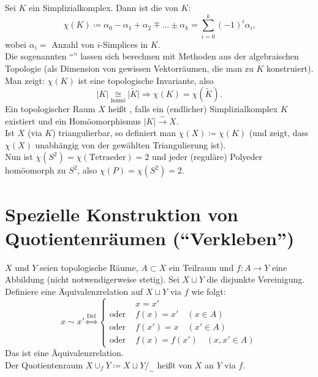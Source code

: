 \begin{definition}
  Sei \( K \) ein Simplizialkomplex. Dann ist die \label{def:eulercharakteristikSimplizialkomplex} von \( K \):
  \begin{equation*}
    \chi(K) \coloneqq \alpha_0-\alpha_1+\alpha_2 \mp \dots \pm \alpha_k = \sum_{i = 0}^k {(-1)}^i\alpha_i\text{,}
  \end{equation*}
  wobei \( \alpha_i = \) Anzahl von \( i \)-Simplices in \( K \). \\
  Die sogenannten ``''\label{def:bettiZahlen} lassen sich berechnen mit Methoden aus der algebraischen Topologie (als Dimension von gewissen Vektorräumen, die man zu \( K \) konstruiert). \\
  Man zeigt: \( \chi(K) \) ist eine topologische Invariante, also 
  \begin{equation*}
    \vert K \vert \underset{\text{homö}}{\cong} \vert \widetilde{K} \vert \Rightarrow \chi(K) = \chi(\widetilde{K})\text{.}
  \end{equation*}
  Ein topologischer Raum \( X \) heißt \label{def:triangulierbar}, falls ein (endlicher) Simplizialkomplex \( K \) existiert und ein Homöomorphismus \( \vert K \vert \overset{\sim}{\to} X \). \\
  Ist \( X \) (via \( K \)) triangulierbar, so definiert man \( \chi(X) \coloneqq \chi(K) \) (und zeigt, dass \( \chi(X) \) unabhängig von der gewählten Triangulierung ist). \\
  Nun ist \( \chi(S^2) = \chi(\text{Tetraeder}) = 2 \) und jeder (reguläre) Polyeder homöomorph zu \( S^2 \), also \( \chi(P) = \chi(S^2) = 2 \).
\end{definition}

\section{Spezielle Konstruktion von Quotientenräumen (``Verkleben'')}

\begin{definition}[Verklebung]
  \( X \) und \( Y \) seien topologische Räume, \( A \subset X \) ein Teilraum und \( f: A \to Y \) eine Abbildung (nicht notwendigerweise stetig). Sei \( X \sqcup Y \) die disjunkte Vereinigung. Definiere eine Äquivalenzrelation auf \( X \sqcup Y \) via \( f \) wie folgt:
  \begin{equation*}
    x \sim x' \overset{\text{Def}}{\Leftrightarrow} \begin{cases}
      &x = x' \\
      \text{oder } &f(x) = x' \quad (x \in A) \\
      \text{oder } &f(x') = x \quad (x' \in A) \\
      \text{oder } &f(x) = f(x') \quad (x, x' \in A)
    \end{cases}
  \end{equation*}
  Das ist eine Äquivalenzrelation. \\
  Der Quotientenraum \( X \cup_f Y \coloneqq X \sqcup Y /_\sim \) heißt \label{def:verklebung} von \( X \) an \( Y \) via \( f \).
\end{definition}

